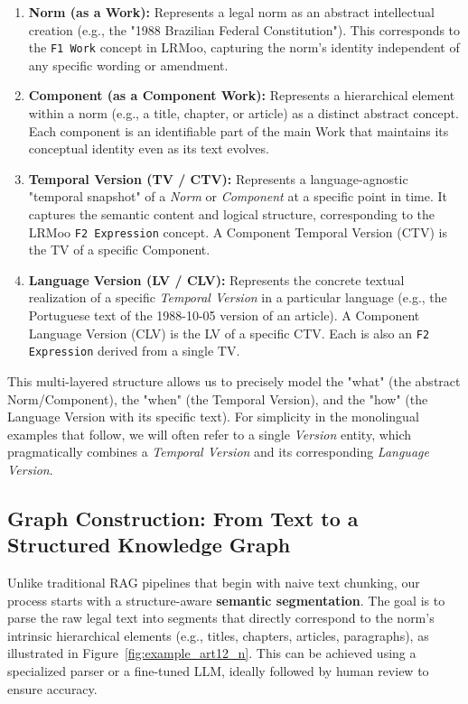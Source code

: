 \documentclass[11pt]{article}
\begin{document}
\begin{enumerate}
    \item \textbf{Norm (as a Work):} Represents a legal norm as an abstract intellectual creation (e.g., the "1988 Brazilian Federal Constitution"). This corresponds to the \texttt{F1 Work} concept in LRMoo, capturing the norm's identity independent of any specific wording or amendment.

    \item \textbf{Component (as a Component Work):} Represents a hierarchical element within a norm (e.g., a title, chapter, or article) as a distinct abstract concept. Each component is an identifiable part of the main Work that maintains its conceptual identity even as its text evolves.

    \item \textbf{Temporal Version (TV / CTV):} Represents a language-agnostic "temporal snapshot" of a \textit{Norm} or \textit{Component} at a specific point in time. It captures the semantic content and logical structure, corresponding to the LRMoo \texttt{F2 Expression} concept. A Component Temporal Version (CTV) is the TV of a specific Component.

    \item \textbf{Language Version (LV / CLV):} Represents the concrete textual realization of a specific \textit{Temporal Version} in a particular language (e.g., the Portuguese text of the 1988-10-05 version of an article). A Component Language Version (CLV) is the LV of a specific CTV. Each is also an \texttt{F2 Expression} derived from a single TV.
\end{enumerate}

This multi-layered structure allows us to precisely model the "what" (the abstract Norm/Component), the "when" (the Temporal Version), and the "how" (the Language Version with its specific text). For simplicity in the monolingual examples that follow, we will often refer to a single \emph{Version} entity, which pragmatically combines a \emph{Temporal Version} and its corresponding \emph{Language Version}.

\subsection{Graph Construction: From Text to a Structured Knowledge Graph}
\label{sec:graph_construction}

Unlike traditional RAG pipelines that begin with naive text chunking, our process starts with a structure-aware \textbf{semantic segmentation}. The goal is to parse the raw legal text into segments that directly correspond to the norm's intrinsic hierarchical elements (e.g., titles, chapters, articles, paragraphs), as illustrated in Figure~\ref{fig:example_art12_n}. This can be achieved using a specialized parser or a fine-tuned LLM, ideally followed by human review to ensure accuracy.
\end{document}
